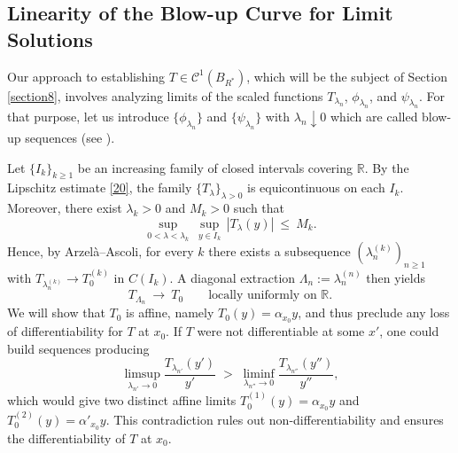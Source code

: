 \documentclass[
  sn-mathphys-num,
  colorlinks,
  linkcolor=darkmagenta,
  citecolor=rufous,
  urlcolor=zaffre,
  hypertexnames=false
]{sn-jnl}
\numberwithin{equation}{section}
\begin{document}
\subsection{Linearity of the Blow-up Curve for Limit Solutions}\label{sec6.2}
Our approach to establishing \( T \in \mathcal{C}^1(B_{R^*}) \), which will be the subject of Section \ref{section8},    involves analyzing limits of the scaled functions \( T_{\lambda_n} \), \( \phi_{\lambda_n} \), and \( \psi_{\lambda_n} \).
For that purpose, let us introduce $\{\phi_{\lambda_n}\}$ and $\{\psi_{\lambda_n}\}$ with $\lambda_n \downarrow 0$ which  are called blow-up sequences (see \cite{Caffarelli1986}).

\medskip
Let \(\{I_k\}_{k\ge1}\) be an increasing family of closed intervals covering \(\mathbb{R}\).
By the Lipschitz estimate \eqref{20}, the family \(\{T_\lambda\}_{\lambda>0}\) is equicontinuous on each \(I_k\).
Moreover, there exist \(\lambda_k>0\) and \(M_k>0\) such that
$$
\sup_{0<\lambda<\lambda_k}\ \sup_{y\in I_k}\,|T_\lambda(y)|\ \le\ M_k.
$$
Hence, by Arzelà–Ascoli, for every \(k\) there exists a subsequence \((\lambda^{(k)}_n)_{n\ge 1}\) with
\(T_{\lambda_n^{(k)}}\to T_0^{(k)}\) in \(C(I_k)\).
A diagonal extraction \(\Lambda_n:=\lambda_n^{(n)}\) then yields
$$
T_{\Lambda_n}\ \longrightarrow\ T_0 \qquad\text{locally uniformly on }\mathbb{R}.
$$
We will  show that \(T_0\) is affine, namely \(T_0(y)=\alpha_{x_0}y\), and thus preclude any loss of differentiability for \(T\) at \(x_0\).
If \(T\) were not differentiable at some \(x'\), one could build sequences producing
\begin{equation}\label{eq:4.22}
\limsup_{\lambda_{n'}\to 0}\frac{T_{\lambda_{n'}}(y')}{y'}\;>\;
\liminf_{\lambda_{n''}\to 0}\frac{T_{\lambda_{n''}}(y'')}{y''},
\end{equation}
which would give two distinct affine limits \(T_0^{(1)}(y)=\alpha_{x_0}y\) and \(T_0^{(2)}(y)=\alpha'_{x_0}y\).
This contradiction rules out non-differentiability and ensures the differentiability of \(T\) at \(x_0\).
\end{document}
